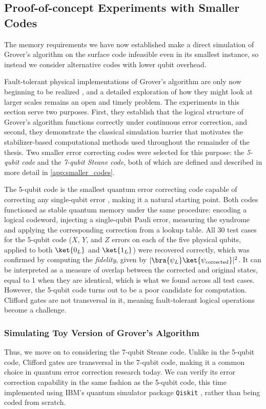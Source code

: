 
\subsection{Proof-of-concept Experiments with Smaller Codes}\label{sec:smaller_code_experiments}
The memory requirements we have now established make a direct simulation of Grover's algorithm on the surface code infeasible even in its smallest instance, so instead we consider alternative codes with lower qubit overhead.

Fault-tolerant physical implementations of Grover's algorithm are only now beginning to be realized \cite{Butt2026}, and a detailed exploration of how they might look at larger scales remains an open and timely problem. The experiments in this section serve two purposes. First, they establish that the logical structure of Grover's algorithm functions correctly under continuous error correction, and second, they demonstrate the classical simulation barrier that motivates the stabilizer-based computational methods used throughout the remainder of the thesis. Two smaller error correcting codes were selected for this purpose: the \emph{5-qubit code} and the \emph{7-qubit Steane code}, both of which are defined and described in more detail in \cref{app:smaller_codes}.

The 5-qubit code is the smallest quantum error correcting code capable of correcting any single-qubit error \cite{Nielsen_Chuang_2010}, making it a natural starting point. Both codes functioned as stable quantum memory under the same procedure: encoding a logical codeword, injecting a single-qubit Pauli error, measuring the syndrome and applying the corresponding correction from a lookup table. All 30 test cases for the 5-qubit code ($X$, $Y$, and $Z$ errors on each of the five physical qubits, applied to both $\ket{0_L}$ and $\ket{1_L}$) were recovered correctly, which was confirmed by computing the \emph{fidelity}, given by $|\bra{\psi_L} \ket {\psi_{\text{corrected}}}|^2$. It can be interpreted as a measure of overlap between the corrected and original states, equal to 1 when they are identical, which is what we found across all test cases. However, the 5-qubit code turns out to be a poor candidate for computation. Clifford gates are not transversal in it, meaning fault-tolerant logical operations become a challenge.

\subsubsection{Simulating Toy Version of Grover's Algorithm}\label{subsec:toyversion}
Thus, we move on to considering the 7-qubit Steane code. Unlike in the 5-qubit code, Clifford gates are transversal in the 7-qubit code, making it a common choice in quantum error correction research today. We can verify its error correction capability in the same fashion as the 5-qubit code, this time implemented using IBM's quantum simulator package \texttt{Qiskit} \cite{qiskit2024}, rather than being coded from scratch.

